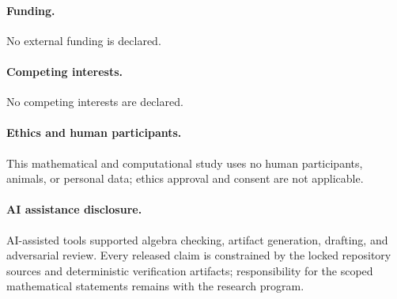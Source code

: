 \documentclass[11pt]{article}
\theoremstyle{definition}
\theoremstyle{remark}
\begin{document}
\paragraph{Funding.}
No external funding is declared.

\paragraph{Competing interests.}
No competing interests are declared.

\paragraph{Ethics and human participants.}
This mathematical and computational study uses no human participants,
animals, or personal data; ethics approval and consent are not applicable.

\paragraph{AI assistance disclosure.}
AI-assisted tools supported algebra checking, artifact generation, drafting,
and adversarial review.  Every released claim is constrained by the locked
repository sources and deterministic verification artifacts; responsibility
for the scoped mathematical statements remains with the research program.



\end{document}
